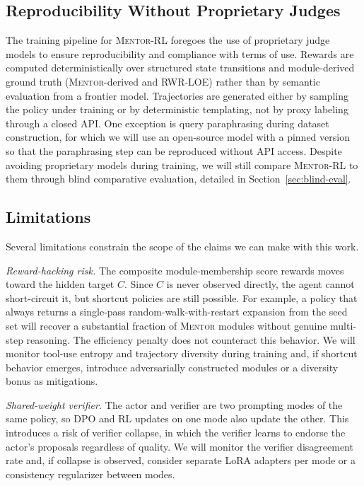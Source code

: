 \documentclass[thesis,letterpaper,12pt]{utthesis}
\begin{document}
\subsection{Reproducibility Without Proprietary Judges}
The training pipeline for \textsc{Mentor-RL} foregoes the use of proprietary judge models to ensure reproducibility and compliance with terms of use. Rewards are computed deterministically over structured state transitions and module-derived ground truth (\textsc{Mentor}-derived and RWR-LOE) rather than by semantic evaluation from a frontier model. Trajectories are generated either by sampling the policy under training or by deterministic templating, not by proxy labeling through a closed API. One exception is query paraphrasing during dataset construction, for which we will use an open-source model with a pinned version so that the paraphrasing step can be reproduced without API access. Despite avoiding proprietary models during training, we will still compare \textsc{Mentor-RL} to them through blind comparative evaluation, detailed in Section~\ref{sec:blind-eval}.

\subsection{Limitations}\label{sec:limitations}
Several limitations constrain the scope of the claims we can make with this work.

\textit{Reward-hacking risk.} The composite module-membership score rewards moves toward the hidden target $C$. Since $C$ is never observed directly, the agent cannot short-circuit it, but shortcut policies are still possible. For example, a policy that always returns a single-pass random-walk-with-restart expansion from the seed set will recover a substantial fraction of \textsc{Mentor} modules without genuine multi-step reasoning. The efficiency penalty does not counteract this behavior. We will monitor tool-use entropy and trajectory diversity during training and, if shortcut behavior emerges, introduce adversarially constructed modules or a diversity bonus as mitigations.

\textit{Shared-weight verifier.} The actor and verifier are two prompting modes of the same policy, so DPO and RL updates on one mode also update the other. This introduces a risk of verifier collapse, in which the verifier learns to endorse the actor's proposals regardless of quality. We will monitor the verifier disagreement rate and, if collapse is observed, consider separate LoRA adapters per mode or a consistency regularizer between modes.
\end{document}
